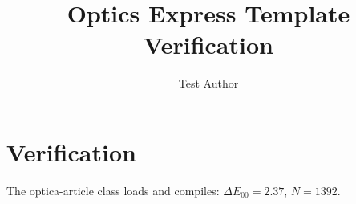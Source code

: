 \documentclass{optica-article}
\begin{document}
\title{Optics Express Template Verification}
\author{Test Author}
\section{Verification}
The optica-article class loads and compiles: $\Delta E_{00} = 2.37$, $N=1392$.
\end{document}

